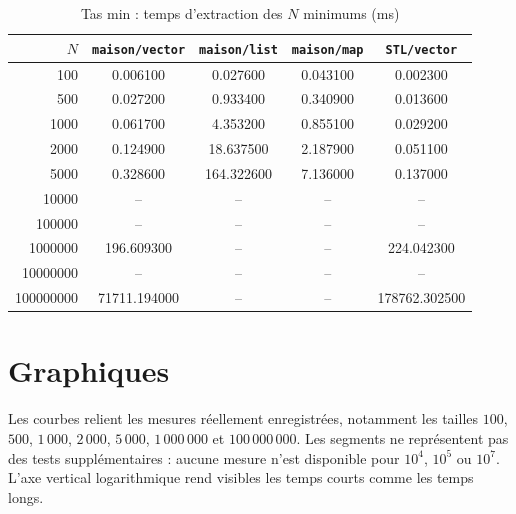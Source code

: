 \documentclass[12pt,a4paper]{article}
\begin{document}
\begin{table}[htbp]
\centering
\caption{Tas min : temps d'extraction des $N$ minimums (ms)}
\small
\begin{tabular}{r S[table-format=6.6] S[table-format=6.6] S[table-format=6.6] S[table-format=6.6]}
\toprule
{$N$} & {\texttt{maison/vector}} & {\texttt{maison/list}} & {\texttt{maison/map}} & {\texttt{STL/vector}} \\
       & 0.006100 & 0.027600 & 0.043100 & 0.002300 \\
500       & 0.027200 & 0.933400 & 0.340900 & 0.013600 \\
1000      & 0.061700 & 4.353200 & 0.855100 & 0.029200 \\
2000      & 0.124900 & 18.637500 & 2.187900 & 0.051100 \\
5000      & 0.328600 & 164.322600 & 7.136000 & 0.137000 \\
10000     &  &  &  &  \\
100000    &  &  &  &  \\
1000000   & 196.609300 &  &  & 224.042300 \\
10000000  &  &  &  &  \\
100000000 & 71711.194000 &  &  & 178762.302500 \\
\bottomrule
\end{tabular}
\end{table}

\clearpage
\section{Graphiques}

Les courbes relient les mesures réellement enregistrées, notamment les
tailles $100$, $500$, $1\,000$, $2\,000$, $5\,000$, $1\,000\,000$ et
$100\,000\,000$. Les segments ne représentent pas des tests supplémentaires :
aucune mesure n'est disponible pour $10^4$, $10^5$ ou $10^7$. L'axe vertical
logarithmique rend visibles les temps courts comme les temps longs.

\end{document}
